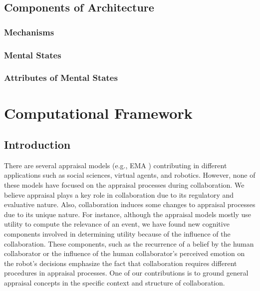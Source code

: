 \documentclass[12pt]{report}
\begin{document}
\section{Components of Architecture}

\subsection{Mechanisms}

\subsection{Mental States}
\label{sec:mental-states}

\subsection{Attributes of Mental States}
\label{sec:mental-states-attributes}

\chapter{Computational Framework}
\label{ch:appraisals}

\vspace*{-2mm}
\section{Introduction}
\vspace*{-3mm}
There are several appraisal models (e.g., EMA \cite{marsella:ema-process-model})
contributing in different applications such as social sciences, virtual agents,
and robotics. However, none of these models have focused on the appraisal
processes during collaboration. We believe appraisal plays a key role in
collaboration due to its regulatory and evaluative nature. Also, collaboration
induces some changes to appraisal processes due to its unique nature. For
instance, although the appraisal models mostly use utility to compute the
relevance of an event, we have found new cognitive components involved in
determining utility because of the influence of the collaboration. These
components, such as the recurrence of a belief by the human collaborator or the
influence of the human collaborator's perceived emotion on the robot's decisions
emphasize the fact that collaboration requires different procedures in appraisal
processes. One of our contributions is to ground general appraisal concepts in
the specific context and structure of collaboration.
\end{document}
